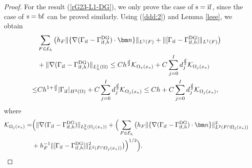 \documentclass[1996/10/24]{amsart}
\theoremstyle{definition}
\numberwithin{equation}{section}
\begin{document}
\begin{proof}
For the result (\ref{rG23-L1-DG}), we only prove the case of ${\rm s=if}$, since the case of ${\rm s=bf}$ can be proved similarly.
Using (\ref{ddd:2}) and Lemma \ref{leee}, we obtain
\begin{align}
&\sum_{F\in\mathcal{E}_h}\left(h_F\|\{\nabla(\Gamma_{{\rm if}}-\Gamma_{{\rm if},h}^{{\rm DG}})\cdot{\bm n}\}\|_{L^1(F)}+\|[\Gamma_{{\rm if}}-\Gamma_{{\rm if},h}^{{\rm DG}}]\|_{L^1(F)}\right)\nonumber\\
&+\|\nabla(\Gamma_{{\rm if}}-\Gamma_{{\rm if},h}^{{\rm DG}})\|_{L_h^1(\Omega)}\leq Ch^{\frac{d}{2}}\mathcal{K}_{\Omega_{\ast}(x_{\ast})}
+C\sum_{j=0}^Id_j^{\frac{d}{2}}\mathcal{K}_{\Omega_j(x_{\ast})}\label{rG23-L1-DG-proof:1}\\
\leq& Ch^{1+\frac{d}{2}}|\Gamma_{{\rm if}}|_{H^2(\Omega)}+C\sum_{j=0}^Id_j^{\frac{d}{2}}\mathcal{K}_{\Omega_j(x_{\ast})}\leq Ch+C\sum_{j=0}^Id_j^{\frac{d}{2}}\mathcal{K}_{\Omega_j(x_{\ast})},\nonumber
\end{align}
where
\begin{align*}
\mathcal{K}_{\Omega_j(x_{\ast})}=&\Big(\|\nabla(\Gamma_{{\rm if}}-\Gamma_{{\rm if},h}^{{\rm DG}})\|_{L_h^2(\Omega_j(x_{\ast}))}+
\Big(\sum_{F\in\mathcal{E}_h}\big(h_F\|\{\nabla(\Gamma_{{\rm if}}-\Gamma_{{\rm if},h}^{{\rm DG}})\cdot{\bm n}\}\|^2_{L^2(F\cap\Omega_j(x_{\ast}))}\\
&+h^{-1}_F\|[\Gamma_{{\rm if}}-\Gamma_{{\rm if},h}^{{\rm DG}}]\|^2_{L^2(F\cap\Omega_j(x_{\ast}))}\big)\Big)^{1/2}\Big).
\end{align*}


\end{proof}
\end{document}
